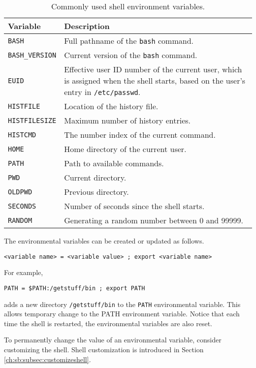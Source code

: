 \begin{table}
	\centering \caption{Commonly used shell environment variables.}\label{ch:sb:tab:shellenvironmentvars}
	\begin{tabularx}{\textwidth}{lX}
		\hline
		Variable & Description \\ \hline
		\verb|BASH| & Full pathname of the \verb|bash| command. \\ 
		\verb|BASH_VERSION| & Current version of the \verb|bash| command. \\ 
		\verb|EUID| & Effective user ID number of the current user, which is assigned when the shell starts, based on the user's entry in \verb|/etc/passwd|. \\ 
		\verb|HISTFILE| & Location of the history file. \\ 
		\verb|HISTFILESIZE| & Maximum number of history entries. \\ 
		\verb|HISTCMD| & The number index of the current command. \\ 
		\verb|HOME| & Home directory of the current user. \\ 
		\verb|PATH| & Path to available commands. \\ 
		\verb|PWD| & Current directory. \\ 
		\verb|OLDPWD| & Previous directory. \\ 
		\verb|SECONDS| & Number of seconds since the shell starts. \\ 
		\verb|RANDOM| & Generating a random number between 0 and 99999. \\
		\hline
	\end{tabularx}
\end{table}

The environmental variables can be created or updated as follows.
\begin{lstlisting}
<variable name> = <variable value> ; export <variable name>
\end{lstlisting}
For example,
\begin{lstlisting}
PATH = $PATH:/getstuff/bin ; export PATH
\end{lstlisting}
adds a new directory \verb|/getstuff/bin| to the \verb|PATH| environmental variable. This allows temporary change to the PATH environment variable. Notice that each time the shell is restarted, the environmental variables are also reset. 

To permanently change the value of an environmental variable, consider customizing the shell. Shell customization is introduced in Section \ref{ch:sb:subsec:customizeshell}.

